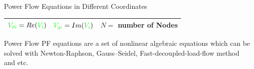 \documentclass[aspectratio=169]{beamer}
\begin{document}
\begin{frame}{Power Flow Equations in Different Coordinates}
{{\begin{center}
\begin{tabular}{|c c|}
$ \textcolor {green}{V_{di}}= Re (\textcolor {green}{V_i})$ \  $ \textcolor {green}{V_{qi}}= Im (\textcolor {green}{V_i})$& $N=$ number of Nodes\\
  \hline
\end{tabular}
\end{center}}}
 {\scriptsize \begin{block}{Power Flow}
PF equations are a set of nonlinear algebraic equations which can be solved with Newton-Raphson, Gauss–Seidel, Fast-decoupled-load-flow method and etc.
\end{block}}

\end{frame}
\end{document}
